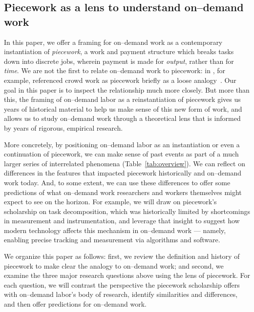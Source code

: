\documentclass[trackingWork]{subfiles}
\begin{document}
\subsection{Piecework as a lens to understand on--demand work}
In this paper, we offer a framing for on--demand work as a contemporary instantiation of \textit{piecework},
a work and payment structure which breaks tasks down into discrete jobs,
wherein payment is made for \textit{output}, rather than for \textit{time}.
We are not the first to relate on--demand work to piecework: in \citeyear{crowdworkFuture}, for example,
\citeauthor{crowdworkFuture} referenced crowd work as piecework briefly
as a loose analogy~\cite{crowdworkFuture}.
Our goal in this paper is to inspect the relationship much more closely.
But more than this,
the framing of on--demand labor as a reinstantiation of piecework 
gives us years of historical material to help us make sense of this new form of work, and
allows us to study on--demand work through a theoretical lens that is informed by years of rigorous, empirical research.

More concretely, by positioning on--demand labor as
an instantiation or even a continuation of piecework, we can make sense of past events as part of a much larger series of interrelated phenomena (Table~\ref{tab:overview}).
We can reflect on differences in the features that impacted piecework historically and on--demand work today.
And, to some extent, we can use these differences to offer some predictions of what on--demand work researchers
and workers themselves
might expect to see on the horizon.
For example, we will draw on piecework's scholarship on task decomposition,
which was historically limited by shortcomings in measurement and instrumentation, and
leverage that insight to suggest how modern technology affects this mechanism in on--demand work
--- namely, enabling precise tracking and measurement via algorithms and software.

We organize this paper as follows:
first, we review the definition and history of piecework
to make clear the analogy to on--demand work;
and second, we examine the three major research questions above using the lens of piecework. 
For each question, we will
contrast the perspective the piecework scholarship offers with on--demand labor's body of research,
identify similarities and differences, and then
offer predictions for on--demand work.

\onlyinsubfile{
  \printbibliography
}
\end{document}
